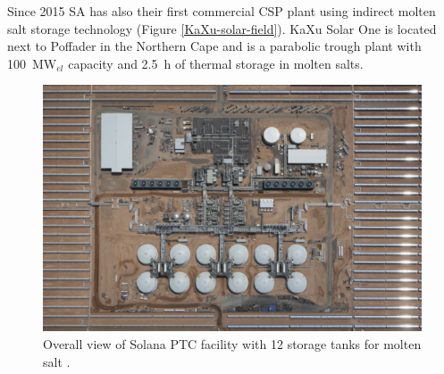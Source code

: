 Since 2015 SA has also their first commercial CSP plant using indirect molten salt storage technology (Figure \ref{KaXu-solar-field}). KaXu Solar One is located next to Poffader in the Northern Cape and is a parabolic trough plant with 100~MW$_{el}$ capacity and 2.5~h of thermal storage in molten salts. \cite{NREL2015c}
\begin{figure}[!bhtp]  
\centering
\includegraphics[width=0.9\linewidth]{FIG/SolanaStorage}
\caption[Overall view of Solana PTC facility with 12 storage tanks for molten salt.]{Overall view of Solana PTC facility with 12 storage tanks for molten salt \cite{AbengoaSolar2013}.}\label{SolanaStorage}
\end{figure}
